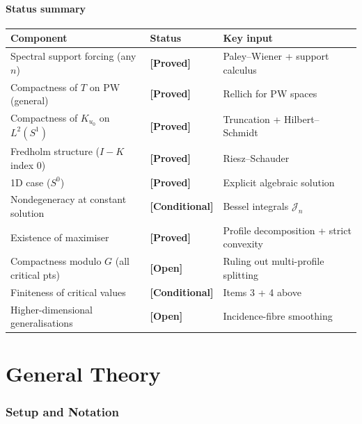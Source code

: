 \documentclass[12pt]{article}
\theoremstyle{definition}
\theoremstyle{remark}
\newcommand{\PW}{\mathrm{PW}}
\newcommand{\proven}{\textbf{\color{teal}[Proved]}}
\newcommand{\conditional}{\textbf{\color{orange}[Conditional]}}
\newcommand{\open}{\textbf{\color{red}[Open]}}
\begin{document}
\subsection{Status summary}
\renewcommand{\arraystretch}{1.4}
\begin{center}
\begin{tabular}{lll}
\hline
\textbf{Component} & \textbf{Status} & \textbf{Key input} \\
\hline
Spectral support forcing (any $n$) &
  \proven & Paley--Wiener + support calculus \\
Compactness of $T$ on $\PW$ (general) &
  \proven & Rellich for PW spaces \\
Compactness of $K_{u_0}$ on $L^2(S^1)$ &
  \proven & Truncation + Hilbert--Schmidt \\
Fredholm structure ($I-K$ index 0) &
  \proven & Riesz--Schauder \\
1D case ($S^0$) & \proven & Explicit algebraic solution \\
Nondegeneracy at constant solution &
  \conditional & Bessel integrals $\mathcal J_n$ \\
Existence of maximiser &
  \proven & Profile decomposition + strict convexity \\
Compactness modulo $G$ (all critical pts) &
  \open & Ruling out multi-profile splitting \\
Finiteness of critical values &
  \conditional & Items 3 + 4 above \\
Higher-dimensional generalisations &
  \open & Incidence-fibre smoothing \\
\hline
\end{tabular}
\end{center}


\part{General Theory}

\section{Setup and Notation}
\label{sec:setup}
\end{document}
